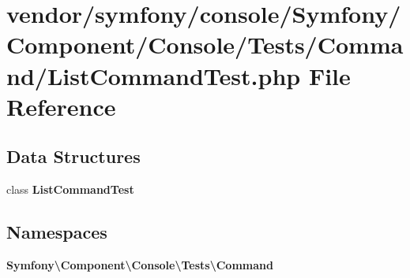 \section{vendor/symfony/console/\+Symfony/\+Component/\+Console/\+Tests/\+Command/\+List\+Command\+Test.php File Reference}
\label{_list_command_test_8php}
\subsection*{Data Structures}
\begin{DoxyCompactItemize}
\item 
class {\bf List\+Command\+Test}
\end{DoxyCompactItemize}
\subsection*{Namespaces}
\begin{DoxyCompactItemize}
\item 
 {\bf Symfony\textbackslash{}\+Component\textbackslash{}\+Console\textbackslash{}\+Tests\textbackslash{}\+Command}
\end{DoxyCompactItemize}
